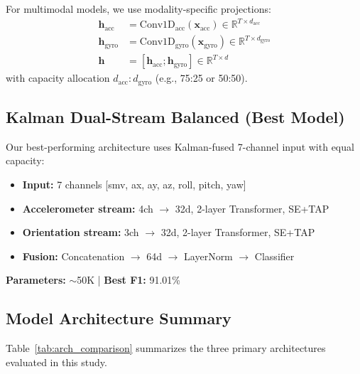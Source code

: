 \documentclass{article}
\begin{document}
For multimodal models, we use modality-specific projections:
\begin{align}
    \mathbf{h}_{\text{acc}} &= \text{Conv1D}_{\text{acc}}(\mathbf{x}_{\text{acc}}) \in \mathbb{R}^{T \times d_{\text{acc}}} \\
    \mathbf{h}_{\text{gyro}} &= \text{Conv1D}_{\text{gyro}}(\mathbf{x}_{\text{gyro}}) \in \mathbb{R}^{T \times d_{\text{gyro}}} \\
    \mathbf{h} &= [\mathbf{h}_{\text{acc}}; \mathbf{h}_{\text{gyro}}] \in \mathbb{R}^{T \times d}
    \label{eq:dual_proj}
\end{align}
with capacity allocation $d_{\text{acc}} : d_{\text{gyro}}$ (e.g., 75:25 or 50:50).

\subsection{Kalman Dual-Stream Balanced (Best Model)}

Our best-performing architecture uses Kalman-fused 7-channel input with equal capacity:

\begin{itemize}
    \item \textbf{Input:} 7 channels [smv, ax, ay, az, roll, pitch, yaw]
    \item \textbf{Accelerometer stream:} 4ch $\rightarrow$ 32d, 2-layer Transformer, SE+TAP
    \item \textbf{Orientation stream:} 3ch $\rightarrow$ 32d, 2-layer Transformer, SE+TAP
    \item \textbf{Fusion:} Concatenation $\rightarrow$ 64d $\rightarrow$ LayerNorm $\rightarrow$ Classifier
\end{itemize}

\textbf{Parameters:} $\sim$50K | \textbf{Best F1:} 91.01\%

\subsection{Model Architecture Summary}

Table~\ref{tab:arch_comparison} summarizes the three primary architectures evaluated in this study.
\end{document}
